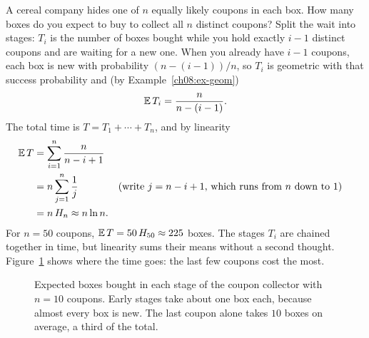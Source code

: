 \begin{example}
\label{ch08:ex-coupon}
A cereal company hides one of $n$ equally likely coupons in each box. How many
boxes do you expect to buy to collect all $n$ distinct coupons? Split the wait
into stages: $T_i$ is the number of boxes bought while you hold exactly $i-1$
distinct coupons and are waiting for a new one. When you already have $i-1$
coupons, each box is new with probability $(n-(i-1))/n$, so $T_i$ is geometric
with that success probability and (by Example~\ref{ch08:ex-geom})
\[
  \operatorname{\mathbb{E}} T_i = \frac{n}{n-(i-1)}.
\]
The total time is $T = T_1 + \cdots + T_n$, and by linearity
\begin{align*}
  \operatorname{\mathbb{E}} T &= \sum_{i=1}^n \frac{n}{n-i+1}\\
       &= n\sum_{j=1}^n \frac1j && \text{(write $j = n-i+1$, which runs from $n$ down to $1$)}\\
       &= n\,H_n \approx n\ln n.
\end{align*}
For $n=50$ coupons, $\operatorname{\mathbb{E}} T = 50\,H_{50} \approx 225$ boxes. The stages $T_i$ are
chained together in time, but linearity sums their means without a second thought.
Figure~\ref{ch08:fig-coupon-stages} shows where the time goes: the last few
coupons cost the most.
\end{example}

\begin{figure}[H]
\centering
{}
\caption{Expected boxes bought in each stage of the coupon collector with
$n = 10$ coupons. Early stages take about one box each, because almost every
box is new. The last coupon alone takes $10$ boxes on average, a third of the
total.}
\label{ch08:fig-coupon-stages}
\end{figure}

